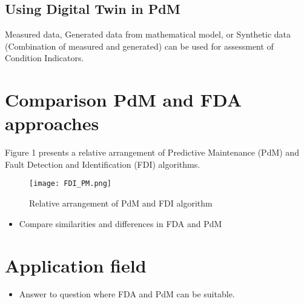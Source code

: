\subsection{Using Digital Twin in PdM}

Measured data, Generated data from mathematical model, or Synthetic data
(Combination of measured and generated) can be used for assessment of
Condition Indicators. 


\section{Comparison PdM and FDA approaches}

Figure 1 presents a relative arrangement of Predictive Maintenance (PdM) and
Fault Detection and Identification (FDI) algorithms. 

\begin{figure}[h!]
    \centering
    \texttt{[image: FDI\_PM.png]}
    \caption{Relative arrangement of PdM and FDI algorithm}
    \label{fig:fdi_pm}
\end{figure}

\begin{itemize}
    \item Compare similarities and differences in FDA and PdM
\end{itemize}

\section{Application field}
\begin{itemize}
    \item Answer to question where FDA and PdM can be suitable.
\end{itemize}
